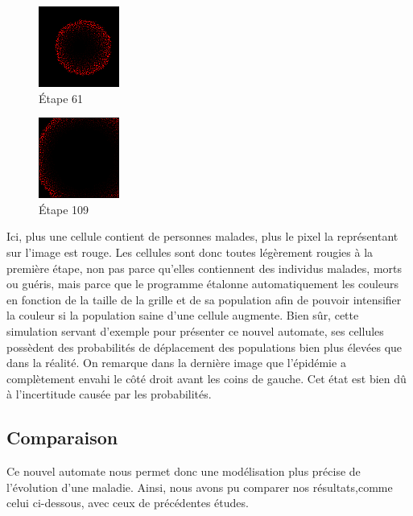 \documentclass{article}
\begin{document}
\begin{figure}[H]
\caption{Étape 61}
\centering
\includegraphics[scale=2]{../images/Frame-61-malades-contr.png}
\end{figure}

\begin{figure}[H]
\caption{Étape 109}
\centering
\includegraphics[scale=2]{../images/Frame-109_malades-contr.png}
\end{figure}


Ici, plus une cellule contient de personnes malades, plus le pixel la représentant sur l'image est rouge. Les cellules sont donc toutes légèrement rougies à la première étape, non pas parce qu'elles contiennent des individus malades, morts ou guéris, mais parce que le programme étalonne automatiquement les couleurs en fonction de la taille de la grille et de sa population afin de pouvoir intensifier la couleur si la population saine d'une cellule augmente.
Bien sûr, cette simulation servant d'exemple pour présenter ce nouvel automate, ses cellules possèdent des probabilités de déplacement des populations bien plus élevées que dans la réalité.
On remarque dans la dernière image que l'épidémie a complètement envahi le côté droit avant les coins de gauche. Cet état est bien dû à l'incertitude causée par les probabilités.

 \subsection{Comparaison}
Ce nouvel automate nous permet donc une modélisation plus précise de l'évolution d'une maladie. Ainsi, nous avons pu comparer nos résultats,comme celui ci-dessous, avec ceux de précédentes études.
\end{document}
